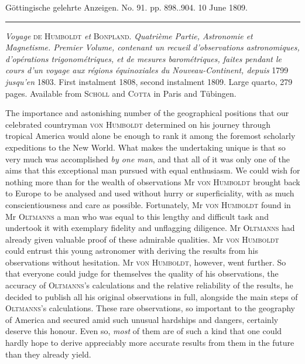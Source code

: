\clearpage
{}
\hypertarget{native-517-lower}{}\label{native-517-lower}
\begin{center}\small Göttingische gelehrte Anzeigen. No. 91. pp. 898..904. 10 June 1809.\\[3pt]\rule{.72\linewidth}{.3pt}\end{center}

\emph{Voyage} \textsc{de Humboldt} \emph{et} \textsc{Bonpland}. \emph{Quatrième Partie, Astronomie et Magnetisme. Premier Volume, contenant un recueil d'observations astronomiques, d'opérations trigonométriques, et de mesures barométriques, faites pendant le cours d'un voyage aux régions équinoxiales du Nouveau-Continent, depuis} 1799 \emph{jusqu'en} 1803. First instalment 1808, second instalment 1809. Large quarto, 279 pages. Available from \textsc{Schöll} and \textsc{Cotta} in Paris and Tübingen.

The importance and astonishing number of the geographical positions that our celebrated countryman \textsc{von Humboldt} determined on his journey through tropical America would alone be enough to rank it among the foremost scholarly expeditions to the New World. What makes the undertaking unique is that so very much was accomplished \emph{by one man}, and that all of it was only one of the aims that this exceptional man pursued with equal enthusiasm. We could wish for nothing more than for the wealth of observations Mr \textsc{von Humboldt} brought back to Europe to be analysed and used without hurry or superficiality, with as much conscientiousness and care as possible. Fortunately, Mr \textsc{von Humboldt} found in Mr \textsc{Oltmanns} a man who was equal to this lengthy and difficult task and undertook it with exemplary fidelity and unflagging diligence. Mr \textsc{Oltmanns} had already given valuable proof of these admirable qualities. Mr \textsc{von Humboldt} could entrust this young astronomer with deriving the results from his observations without hesitation. Mr \textsc{von Humboldt}, however, went further. So that everyone could judge for themselves the quality of his observations, the accuracy of \textsc{Oltmanns}’s calculations and the relative reliability of the results, he decided to publish all his original observations in full, alongside the main steps of \textsc{Oltmanns}’s calculations. These rare observations, so important to the geography of America and secured amid such unusual hardships and dangers, certainly deserve this honour. Even so, \emph{most} of them are of such a kind that one could hardly hope to derive appreciably more accurate results from them in the future than they already yield.

